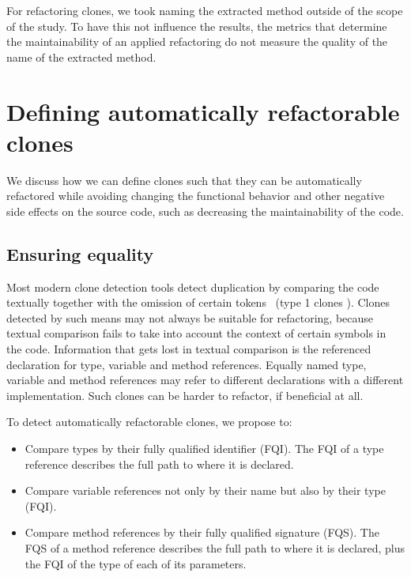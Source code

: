 \documentclass[sigconf,review,anonymous]{acmart}
\begin{document}
For refactoring clones, we took naming the extracted method outside of the scope of the study. To have this not influence the results, the metrics that determine the maintainability of an applied refactoring do not measure the quality of the name of the extracted method. 

\section{Defining automatically refactorable clones}\label{sec:research}
We discuss how we can define clones such that they can be automatically refactored while avoiding changing the functional behavior and other negative side effects on the source code, such as decreasing the maintainability of the code.

\subsection{Ensuring equality}\label{sec:t1r}
Most modern clone detection tools detect duplication by comparing the code textually together with the omission of certain tokens~\cite{roy2009comparison, svajlenko2014evaluating} (type 1 clones \cite{roy2007survey}). Clones detected by such means may not always be suitable for refactoring, because textual comparison fails to take into account the context of certain symbols in the code. Information that gets lost in textual comparison is the referenced declaration for type, variable and method references. Equally named type, variable and method references may refer to different declarations with a different implementation. Such clones can be harder to refactor, if beneficial at all.

To detect automatically refactorable clones, we propose to:
\begin{itemize}
  \item Compare types by their fully qualified identifier (FQI). The FQI of a type reference describes the full path to where it is declared.
  \item Compare variable references not only by their name but also by their type (FQI).
  \item Compare method references by their fully qualified signature (FQS). The FQS of a method reference describes the full path to where it is declared, plus the FQI of the type of each of its parameters.
\end{itemize}
\end{document}
